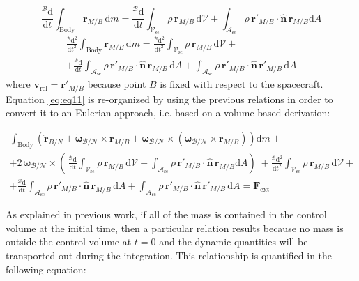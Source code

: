 \begin{equation}
	\frac{^{\mathcal{B}}\text{d}}{\text{d}t}\int_{\text{Body}}\bm{r}_{M/B} \,\text{d}m = \frac{^{\mathcal{B}} \text{d}}{\text{d}t}\int_{\mathcal{V}_{\text{sc}}} \rho\,\bm{r}_{M/B}\,\text{d}\mathcal{V} + \int_{\mathcal{A}_{\text{sc}}} \rho\,\bm{r}'_{M/B}\cdot\bm{\hat{n}}\,\bm{r}_{M/B}\text{d}A
\end{equation}
\begin{multline}
	\frac{^{\mathcal{B}}\text{d}^2}{\text{d}t^2}\int_{\text{Body}}\bm{r}_{M/B}\, \text{d}m = \frac{^{\mathcal{B}} \text{d}^2}{\text{d}t^2}\int_{\mathcal{V}_{\text{sc}}} \rho\,\bm{r}_{M/B} \,\text{d}\mathcal{V} +\\+ \frac{^{\mathcal{B}} \text{d}}{\text{d}t} \int_{\mathcal{A}_\text{sc}} \rho\,\bm{r}'_{M/B}\cdot\bm{\hat{n}} \,\bm{r}_{M/B}\,\text{d}A + \int_{\mathcal{A}_\text{sc}} \rho\,\bm{r}'_{M/B}\cdot\bm{\hat{n}} \,\bm{r}'_{M/B}\,\text{d}A
\end{multline}
\noindent
where $\bm{v}_{\text{rel}} = \bm{r}' _{M/B}$ because point $B$ is fixed with respect to the spacecraft.  Equation \eqref{eq:eq11} is re-organized by using the previous relations in order to convert it to an Eulerian approach, i.e. based on a volume-based  derivation:

\begin{multline}
	\int_{\text{Body}}\left(\ddot{\bm{r}}_{B/N} + \dot{\bm{\omega}}_{\mathcal{B}/\mathcal{N}}\times\bm{r}_{M/B} + \bm{\omega}_{\mathcal{B}/\mathcal{N}} \times\left(\bm{\omega}_{\mathcal{B}/\mathcal{N}} \times\bm{r}_{M/B}\right)\right)\text{d}m +\\+
	2\,\bm{\omega}_{\mathcal{B}/\mathcal{N}}\times\left(\,\frac{^{\mathcal{B}} \text{d}}{\text{d}t}\int_{\mathcal{V}_{\text{sc}}} \rho\,\bm{r}_{M/B}\,\text{d}\mathcal{V} + \int_{\mathcal{A}_{\text{sc}}} \rho\,\bm{r}'_{M/B}\cdot\bm{\hat{n}}\,\bm{r}_{M/B}\text{d}A\right) \;+ 	 \frac{^{\mathcal{B}} \text{d}^2}{\text{d}t^2}\int_{\mathcal{V}_{\text{sc}}} \rho\,\bm{r}_{M/B} \,\text{d}\mathcal{V} +\\+ \frac{^{\mathcal{B}} \text{d}}{\text{d}t} \int_{\mathcal{A}_\text{sc}} \rho\,\bm{r}'_{M/B}\cdot\bm{\hat{n}} \,\bm{r}_{M/B}\,\text{d}A + \int_{\mathcal{A}_\text{sc}} \rho\,\bm{r}'_{M/B}\cdot\bm{\hat{n}} \,\bm{r}'_{M/B}\,\text{d}A
	= \bm{F}_{\text{ext}}
\end{multline}

As explained in previous work, if all of the mass is contained in the control volume at the initial time, then a particular relation results because no mass is outside the control volume at $t=0$ and the dynamic quantities will be transported out during the integration. This relationship is quantified in the following equation:

